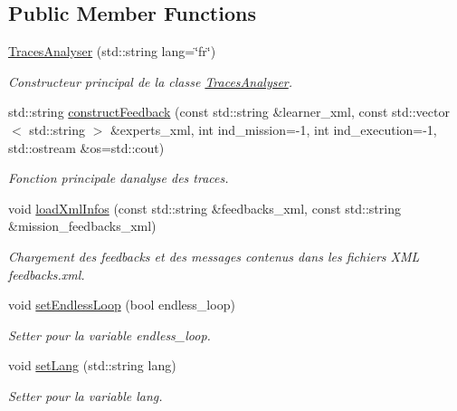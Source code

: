 \subsection*{Public Member Functions}
\begin{DoxyCompactItemize}
\item 
\hyperlink{class_traces_analyser_a3e6e883ed6bc74f787684f1a3c0c7c01}{Traces\+Analyser} (std\+::string lang=\char`\"{}fr\char`\"{})
\begin{DoxyCompactList}\small\item\em Constructeur principal de la classe \hyperlink{class_traces_analyser}{Traces\+Analyser}. \end{DoxyCompactList}\item 
std\+::string \hyperlink{class_traces_analyser_aff9ec49bcec7d983dc41c97d452b3e94}{construct\+Feedback} (const std\+::string \&learner\+\_\+xml, const std\+::vector$<$ std\+::string $>$ \&experts\+\_\+xml, int ind\+\_\+mission=-\/1, int ind\+\_\+execution=-\/1, std\+::ostream \&os=std\+::cout)
\begin{DoxyCompactList}\small\item\em Fonction principale d\textquotesingle{}analyse des traces. \end{DoxyCompactList}\item 
void \hyperlink{class_traces_analyser_aead7e56360dc6778a99ccdb63ac63f1e}{load\+Xml\+Infos} (const std\+::string \&feedbacks\+\_\+xml, const std\+::string \&mission\+\_\+feedbacks\+\_\+xml)
\begin{DoxyCompactList}\small\item\em Chargement des feedbacks et des messages contenus dans les fichiers X\+ML \textquotesingle{}feedbacks.\+xml\textquotesingle{}. \end{DoxyCompactList}\item 
void \hyperlink{class_traces_analyser_a76a830a7ca35812b578d2255fb1a6fe9}{set\+Endless\+Loop} (bool endless\+\_\+loop)
\begin{DoxyCompactList}\small\item\em Setter pour la variable {\ttfamily endless\+\_\+loop}. \end{DoxyCompactList}\item 
void \hyperlink{class_traces_analyser_a9726338ac15091c533c9562942d062e1}{set\+Lang} (std\+::string lang)
\begin{DoxyCompactList}\small\item\em Setter pour la variable {\ttfamily lang}. \end{DoxyCompactList}\end{DoxyCompactItemize}

